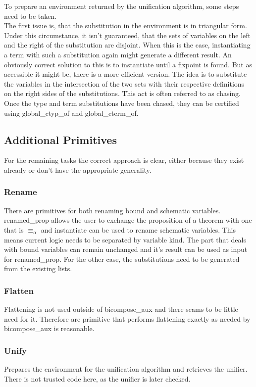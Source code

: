 To prepare an environment returned by the unification algorithm, some steps need to be taken.\\
The first issue is, that the substitution in the environment is in triangular form. Under this circumstance, it isn't guaranteed, that the sets of variables on the left and the right of the substitution are disjoint. When this is the case, instantiating a term with such a substitution again might generate a different result. An obviously correct solution to this is to instantiate until a fixpoint is found. But as accessible it might be, there is a more efficient version. The idea is to substitute the variables in the intersection of the two sets with their respective definitions on the right sides of the substitutions. This act is often referred to as chasing. Once the type and term substitutions have been chased, they can be certified using global\_ctyp\_of and global\_cterm\_of.

\subsection{Additional Primitives}

For the remaining tasks the correct approach is clear, either because they exist already or don't have the appropriate generality.

\subsubsection{Rename} There are primitives for both renaming bound and schematic variables. renamed\_prop allows the user to exchange the proposition of a theorem with one that is $\equiv_\alpha$ and instantiate can be used to rename schematic variables. This means current logic needs to be separated by variable kind. The part that deals with bound variables can remain unchanged and it's result can be used as input for renamed\_prop. For the other case, the substitutions need to be generated from the existing lists.
\subsubsection{Flatten} Flattening is not used outside of bicompose\_aux and there seams to be little need for it. Therefore are primitive that performs flattening exactly as needed by bicompose\_aux is reasonable.
\subsubsection{Unify} Prepares the environment for the unification algorithm and retrieves the unifier. There is not trusted code here, as the unifier is later checked.
